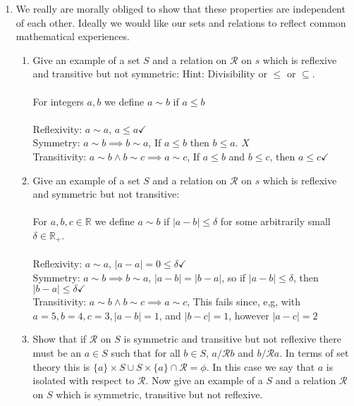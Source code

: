 \documentclass[11pt]{article}
\begin{document}
\begin{enumerate}
\newpage %
\item We really are morally obliged to show that these properties are independent of each other. Ideally we would like our sets and relations to reflect common mathematical experiences.
\begin{enumerate}
\item Give an example of a set $S$ and a relation on $\mathcal{R}$ on $s$ which is reflexive and transitive but not symmetric: Hint: Divisibility or $\leq$ or $\subseteq$.
\\
\\
For integers $a, b$ we define $a \sim b$ if $a \leq b$\\
\\Reflexivity: $a \sim a$, $a \leq a \checkmark$
\\Symmetry: $a \sim b \implies b \sim a$, If $a \leq b$ then $b \leq a$. $X$ 
\\Transitivity: $a \sim b \wedge b \sim c \implies a \sim c$, If $a \leq b$ and $b \leq c$, then $a \leq c \checkmark$
\\
\item Give an example of a set $S$ and a relation on $\mathcal{R}$ on $s$ which is reflexive and symmetric but not transitive:\\
\\
For $a,b,c \in \mathbb{R}$ we define $a \sim b$ if $|a - b| \leq \delta$ for some arbitrarily small $\delta \in \mathbb{R}_+$.
\\
\\Reflexivity: $a \sim a$, $|a-a| = 0 \leq \delta \checkmark$
\\Symmetry: $a \sim b \implies b \sim a$, $|a-b| = |b-a|$, so if $|a-b| \leq \delta$, then $|b-a| \leq \delta  \checkmark$
\\Transitivity: $a \sim b \wedge b \sim c \implies a \sim c$, This fails since, e,g, with $a = 5, b = 4, c = 3, |a-b| = 1$, and $|b-c| = 1$, however $|a-c| = 2$
\item Show that if $\mathcal{R}$ on $S$ is symmetric and transitive but not reflexive there must be an $a \in S$ such that for all $b \in S$, $a /\mathcal{R} b$ and $b  /\mathcal{R} a$. In terms of set theory this is $\{a\} \times S \cup S \times \{a\} \cap \mathcal{R} = \phi$. In this case we say that $a$ is isolated with respect to $\mathcal{R}$. Now give an example of a $S$ and a relation $\mathcal{R}$ on $S$ which is symmetric, transitive but not reflexive.
\\
\\
\\
\\
\\
\\
\\
\\


\end{enumerate}
\end{enumerate}
\end{document}
